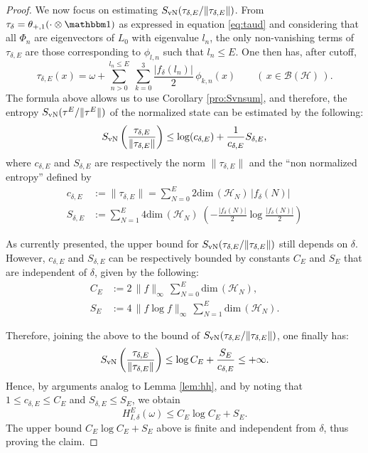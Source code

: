\documentclass[a4paper,12pt]{article}
\theoremstyle{plain}
\theoremstyle{definition}
\theoremstyle{remark}
\newcommand{\Svn}{S_{\rm vN}}
\def\B{{\mathcal B}}
\def\H{{\mathcal H}}
\def\dim{\mathrm{dim}\,}
\def\1{{\mathbbm 1}}
\begin{document}
\begin{proof}
We now focus on estimating $\Svn(\tau_{\delta,E}/\|\tau_{\delta,E}\|)$. From $\tau_\delta=\theta_{+,1}(\cdot \otimes \1)$ as expressed in equation \eqref{eq:taud} and considering that all $\Phi_n$ are eigenvectors of $L_0$ with eigenvalue $l_n$,
the only non-vanishing terms of $\tau_{\delta,E}$ are those corresponding to $\phi_{l,n}$ such that $l_n \le E$. One then has, after cutoff,
 \[
  \tau_{\delta,E}(x) = \omega+
  \sum_{n>0}^{l_n \le E} \;  \sum_{k=0}^3 \frac{|f_\delta(l_n)|}{2}\,\phi_{k,n}(x)
  \qquad (\, x\in \B(\H) \,).
 \]
The formula above allows us to use Corollary \ref{pro:Svnsum}, and therefore, the entropy $\Svn(\tau^E/\|\tau^E\|)$ of the normalized state can be estimated by the following:
 \[
  \Svn\left(\frac{\tau_{\delta,E}}{\|\tau_{\delta,E}\|}\right) \le
  \log( c_{\delta,E} ) + \frac{1}{c_{\delta,E}}{S_{\delta,E}},
 \]
where $c_{\delta,E}$ and $S_{\delta,E}$ are respectively the norm $\|\tau_{\delta,E}\|$ and the ``non normalized entropy'' defined by
\begin{align*}
  c_{\delta,E} &:= \|\tau_{\delta,E}\| = \sum_{N=0}^E 2\dim(\H_N) \, |f_\delta(N)|\\
  S_{\delta,E} &:= \sum_{N=1}^{E} 4\dim(\H_N) \; \left(-\frac{|f_\delta(N)|}2\log\frac{|f_\delta(N)|}2 \right) 
\end{align*}

As currently presented, the upper bound for $\Svn(\tau_{\delta,E}/\|\tau_{\delta,E}\|)$ still depends on $\delta$. However, $c_{\delta,E}$ and $S_{\delta,E}$ can be respectively bounded by constants $C_E$ and $S_E$ that are independent of $\delta$, given by the following:
\begin{align*}
  C_E &:= 2\,\|f\|_{\infty} \,\sum_{N=0}^E \dim(\H_N), \\
  S_E &:= 4\,\|f\log f\|_\infty \, \sum_{N=1}^E \dim(\H_N). 
\end{align*}

Therefore, joining the above to the bound of $\Svn(\tau_{\delta,E}/\|\tau_{\delta,E}\|)$, one finally has:
\[
  \Svn\left(\frac{\tau_{\delta,E}}{\|\tau_{\delta,E}\|}\right) \le
  \log C_E + \frac{S_E}{c_{\delta,E}} \le +\infty.
\]
Hence, by arguments analog to Lemma \ref{lem:hh}, and by noting that
$1\le c_{\delta,E} \le C_E$ and $S_{\delta,E} \le S_E$, we obtain
\[
 H_{I,\delta}^E(\omega) \le C_E\log C_E + S_E.
\]
The upper bound $C_E \log C_E + S_E$ above is finite and independent from $\delta$, thus proving the claim.
\end{proof}

\end{document}
